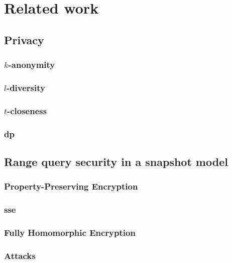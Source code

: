 \chapter{Related work}\label{section:related-work}
\thispagestyle{myheadings}

	\section{Privacy}

		\subsection{$k$-anonymity}

		\subsection{$l$-diversity}

		\subsection{$t$-closeness}

		\subsection{\texorpdfstring{\acrlong{dp}}{Differential Privacy}}

	\section{Range query security in a snapshot model}

		\subsection{Property-Preserving Encryption}

		\subsection{\texorpdfstring{\acrlong{sse}}{Searchable Symmetric Encryption}}

		\subsection{Fully Homomorphic Encryption}

		\subsection{Attacks}

